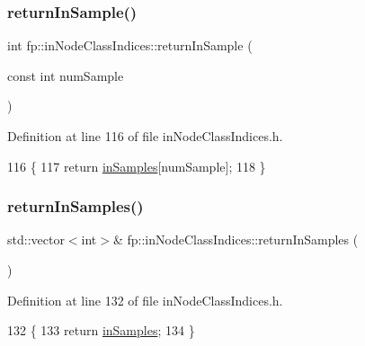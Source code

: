 \subsubsection{\texorpdfstring{return\+In\+Sample()}{returnInSample()}}
{\footnotesize\ttfamily int fp\+::in\+Node\+Class\+Indices\+::return\+In\+Sample (\begin{DoxyParamCaption}\item[{const int}]{num\+Sample }\end{DoxyParamCaption})\hspace{0.3cm}{\ttfamily [inline]}}



Definition at line 116 of file in\+Node\+Class\+Indices.\+h.


\begin{DoxyCode}
116                                                           \{
117                 \textcolor{keywordflow}{return} \hyperlink{classfp_1_1inNodeClassIndices_ae830eec1ee5490f4fe4fb3d579ac78eb}{inSamples}[numSample];
118             \}
\end{DoxyCode}
\mbox{\label{classfp_1_1inNodeClassIndices_a129b49f3d1b1346f60f393799741ada0}} 
\subsubsection{\texorpdfstring{return\+In\+Samples()}{returnInSamples()}}
{\footnotesize\ttfamily std\+::vector$<$int$>$\& fp\+::in\+Node\+Class\+Indices\+::return\+In\+Samples (\begin{DoxyParamCaption}{ }\end{DoxyParamCaption})\hspace{0.3cm}{\ttfamily [inline]}}



Definition at line 132 of file in\+Node\+Class\+Indices.\+h.


\begin{DoxyCode}
132                                                     \{
133                 \textcolor{keywordflow}{return} \hyperlink{classfp_1_1inNodeClassIndices_ae830eec1ee5490f4fe4fb3d579ac78eb}{inSamples};
134             \}
\end{DoxyCode}
\mbox{\label{classfp_1_1inNodeClassIndices_a1a5f1c59beb9e9e92fa7c6ea648e9cfa}} 
